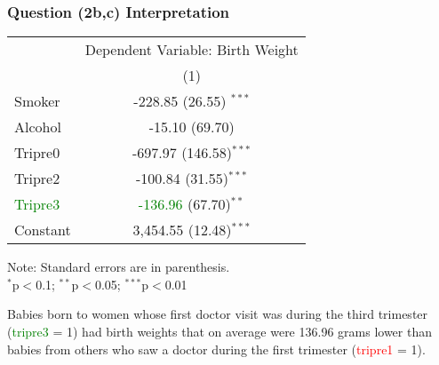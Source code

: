 \documentclass[11pt, xcolor=x11names,compress]{beamer}
\begin{document}
\begin{frame}[fragile,t]
\frametitle{Question (2b,c) Interpretation} 
\begin{center}
\begin{threeparttable}
\begin{tabular}{lc} 
\hline 
 & \multicolumn{1}{c}{Dependent Variable: Birth Weight} \\ 
\cline{2-2} 
 & (1) \\ 
\hline 
 Smoker & -228.85 (26.55) $^{***}$ \\ 
  Alcohol & -15.10 (69.70)\\ 
  Tripre0 & -697.97 (146.58)$^{***}$ \\ 
  Tripre2 & -100.84 (31.55)$^{***}$ \\ 
  \textcolor{green}{Tripre3} & \textcolor{green}{-136.96} (67.70)$^{**}$ \\ 
  Constant & 3,454.55 (12.48)$^{***}$ \\ 
 \hline 
\end{tabular} 
\begin{tablenotes}[flushleft]
\footnotesize
Note: Standard errors are in parenthesis. \\
$^{*}$p$<$0.1; $^{**}$p$<$0.05; $^{***}$p$<$0.01 \\ 
\end{tablenotes}
\end{threeparttable}
\end{center}
Babies born to women whose first doctor visit was during the third
trimester (\textcolor{green}{tripre3} = 1) had birth weights that on average were
136.96 grams lower than babies from others who saw a doctor
during the first trimester (\textcolor{red}{tripre1} = 1).
\end{frame}
\end{document}
